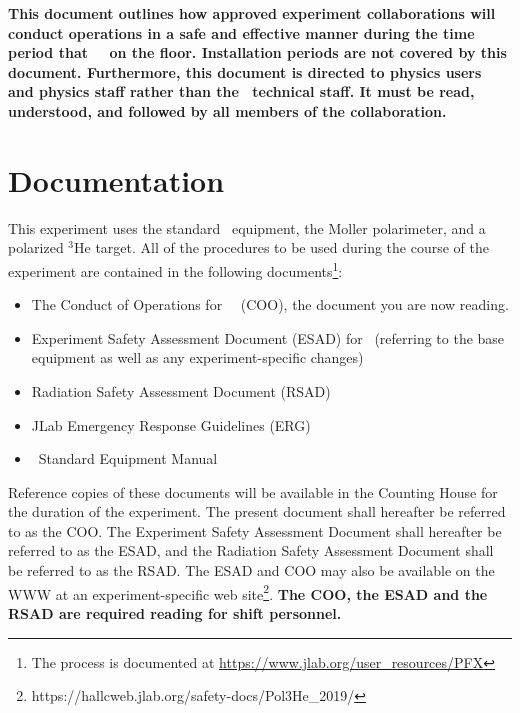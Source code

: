 \documentclass[10pt]{article}
\begin{document}
{\bf This document outlines how approved experiment collaborations will conduct
operations in a safe and effective manner during the time period that
\EXPTS\ \BETENSE\ on the floor. Installation
periods are not covered by this document.
Furthermore, this document is directed to physics users and
physics staff rather than the \HALL\ technical staff.  It must be read,
understood, and followed by all members of the collaboration. }

\section{Documentation}

This experiment uses the standard \HALL\ equipment,
the Moller polarimeter, and a polarized $^3$He target.
All of the procedures to be used during the course of the experiment are contained in the following
documents\footnote{The process is documented at \url{https://www.jlab.org/user_resources/PFX} }:

\begin{itemize}

\item  The Conduct of Operations for \HALL\ \EXPTS\
 (COO), the document you are now reading.

\item   Experiment Safety Assessment Document (ESAD)
for \EXPTS\ (referring to the base equipment as well as any
experiment-specific changes)

\item Radiation Safety Assessment Document (RSAD)

\item JLab Emergency Response Guidelines (ERG)

\item \HALL\ Standard Equipment Manual

\end{itemize}


Reference copies of these documents will be available in the Counting
House for the duration of the experiment. The present document shall
hereafter be referred to as the COO. The Experiment Safety Assessment
Document shall hereafter be referred to as the ESAD, and the
Radiation Safety Assessment Document shall be referred to as the RSAD.
The ESAD and COO may also be available on the WWW at an experiment-specific
web site\footnote{https://hallcweb.jlab.org/safety-docs/Pol3He\_2019/}. {\bf The COO, the ESAD and the RSAD are required reading for
shift personnel.}
\end{document}
